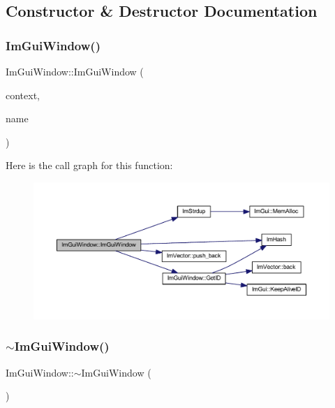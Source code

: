 \subsection{Constructor \& Destructor Documentation}
\mbox{\label{struct_im_gui_window_acd2909ae3b7079de81d528327cc11dfd}} 
\subsubsection{\texorpdfstring{Im\+Gui\+Window()}{ImGuiWindow()}}
{\footnotesize\ttfamily Im\+Gui\+Window\+::\+Im\+Gui\+Window (\begin{DoxyParamCaption}\item[{\mbox{\hyperlink{struct_im_gui_context}{Im\+Gui\+Context}} $\ast$}]{context,  }\item[{const char $\ast$}]{name }\end{DoxyParamCaption})}

Here is the call graph for this function\+:
\nopagebreak
\begin{figure}[H]
\begin{center}
\leavevmode
\includegraphics[width=350pt]{struct_im_gui_window_acd2909ae3b7079de81d528327cc11dfd_cgraph}
\end{center}
\end{figure}
\mbox{\label{struct_im_gui_window_a8e81d730c3a39a71e6b6ca4654451c53}} 
\subsubsection{\texorpdfstring{$\sim$\+Im\+Gui\+Window()}{~ImGuiWindow()}}
{\footnotesize\ttfamily Im\+Gui\+Window\+::$\sim$\+Im\+Gui\+Window (\begin{DoxyParamCaption}{ }\end{DoxyParamCaption})}

